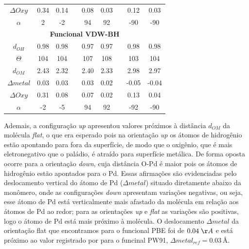 \begin{table}[h!]
\begin{tabular}{ccccccccc}
		$\Delta Oxy$   & 0.34              & 0.14              &  & 0.08             & 0.03              &  & 0.12              & 0.03               \\ 
		$\alpha$           	     &   2                &           -2        &  &     94              &           92        &  &     -90              &    -90                \\
		\midrule \multicolumn{9}{c}{\textbf{Funcional VDW-BH}}                                                                                                                            \\ \midrule	
		$ d_{OH} $            & 0.98              & 0.98              &  & 0.97              & 0.97              &  & 0.98              & 0.98               \\	
		$\Theta$              & 104               & 104               &  & 107               & 108              &  & 103               & 104                \\ 
		$ d_{OM} $ & 2.43            & 2.32              &  & 2.40              & 2.33              &  & 2.98             & 2.97\\ 

		$\Delta metal$  & 0.03            & 0.03             &  & 0.03              & 0.02              &  & -0.05             & -0.04               \\ 
		
		$\Delta Oxy$    & 0.31              & 0.08             &  & 0.07             & 0.02              &  & 0.13              & 0.04               \\ 
		
		$\alpha$      	     &   -2                &           -5        &  &     94              &           92        &  &     -92              &    -90                \\
	

		\hline\hline
	\end{tabular}
\end{table}

 Ademais, a configuração \textit{up} apresentou valores próximos à distância $ d_{OM} $ da molécula \textit{flat}, o que era esperado pois na orientação \textit{up} os átomos de hidrogênio estão apontando para fora da superfície, de modo que o oxigênio, que é mais eletronegativo que o paládio, é atraído para superfície metálica. De forma oposta ocorre para a orientação \textit{down}, cuja distância O-Pd é maior pois os átomos de hidrogênio estão apontados para o Pd. Essas afirmações são evidenciadas pelo deslocamento vertical do átomo de Pd ($ \Delta metal $) situado diretamente abaixo da monômero, onde as configurações \textit{down} apresentam variações negativas, ou seja, esse átomo de Pd está verticalmente mais afastado da molécula em relação aos átomos de Pd ao redor; para as orientações \textit{up} e \textit{flat} as variações são positivas, logo o átomo de Pd está mais próximo à molécula. O deslocamento $ \Delta metal $ da orientação flat que encontramos para o funcional PBE foi de $0.04\;\AA$ e está próximo ao valor registrado por \citeauthor{michaedelis} para o funcinal PW91, $ \Delta metal_{ref}=0.03\,\si{\angstrom} $. 
 
